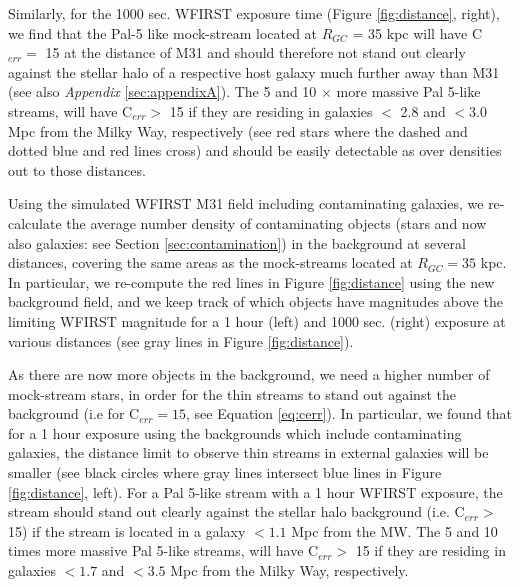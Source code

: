 \documentclass[twocolumn]{aastex62}
\begin{document}
Similarly, for the 1000 sec. WFIRST exposure time (Figure \ref{fig:distance}, right), we find that the Pal-5 like mock-stream located at $R_{GC}$ = 35 kpc will have C$_{err} =$ 15 at the distance of M31 and should therefore not stand out clearly against the stellar halo of a respective host galaxy much further away than M31 (see also {\it Appendix} \ref{sec:appendixA}). The 5 and 10 $\times$  more massive Pal 5-like streams, will have C$_{err} >$ 15 if they are residing in galaxies $<$ 2.8 and $<$3.0 Mpc from the Milky Way, respectively (see red stars where the dashed and dotted blue and red lines cross) and should be easily detectable as over densities out to those distances.

Using the simulated WFIRST M31 field including contaminating galaxies, we re-calculate the average number density of contaminating objects (stars and now also galaxies: see Section \ref{sec:contamination}) in the background at several distances, covering the same areas as the mock-streams located at $R_{GC} = 35$ kpc. In particular, we re-compute the red lines in Figure \ref{fig:distance} using the new background field, and we keep track of which objects have magnitudes above the limiting WFIRST magnitude for a 1 hour (left) and 1000 sec. (right) exposure at various distances (see gray lines in Figure \ref{fig:distance}). 

As there are now more objects in the background, we need a higher number of mock-stream stars, in order for the thin streams to stand out against the background (i.e for C$_{err} = 15$, see Equation \ref{eq:cerr}). In particular, we found that for a 1 hour exposure using the backgrounds which include contaminating galaxies, the distance limit to observe thin streams in external galaxies will be smaller (see black circles where gray lines intersect blue lines in Figure \ref{fig:distance}, left). For a Pal 5-like stream with a 1 hour WFIRST exposure, the stream should stand out clearly against the stellar halo background (i.e. C$_{err} >$ 15) if the stream is located in a galaxy $<1.1$ Mpc from the MW. The 5 and 10 times more massive Pal 5-like streams, will have C$_{err} >$ 15 if they are residing in galaxies $<1.7$ and $<3.5$ Mpc from the Milky Way, respectively. 
\end{document}
